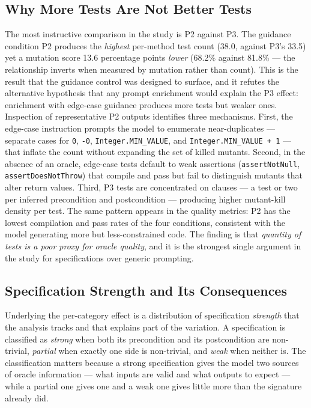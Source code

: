 \subsection{Why More Tests Are Not Better Tests}

The most instructive comparison in the study is P2 against P3. The guidance
condition P2 produces the \emph{highest} per-method test count (38.0, against
P3's 33.5) yet a mutation score 13.6 percentage points \emph{lower} (68.2\%
against 81.8\% --- the relationship inverts when measured by mutation rather
than count). This is the result that the guidance control was designed to
surface, and it refutes the alternative hypothesis that any prompt enrichment
would explain the P3 effect: enrichment with edge-case guidance produces more
tests but weaker ones. Inspection of representative P2 outputs identifies three
mechanisms. First, the edge-case instruction prompts the model to enumerate
near-duplicates --- separate cases for \texttt{0}, \texttt{-0},
\texttt{Integer.MIN\_VALUE}, and \texttt{Integer.MIN\_VALUE + 1} --- that
inflate the count without expanding the set of killed mutants. Second, in the
absence of an oracle, edge-case tests default to weak assertions
(\texttt{assertNotNull}, \texttt{assertDoesNotThrow}) that compile and pass but
fail to distinguish mutants that alter return values. Third, P3 tests are
concentrated on clauses --- a test or two per inferred precondition and
postcondition --- producing higher mutant-kill density per test. The same
pattern appears in the quality metrics: P2 has the lowest compilation and pass
rates of the four conditions, consistent with the model generating more but
less-constrained code. The finding is that \emph{quantity of tests is a poor
proxy for oracle quality}, and it is the strongest single argument in the study
for specifications over generic prompting.

\subsection{Specification Strength and Its Consequences}

Underlying the per-category effect is a distribution of specification
\emph{strength} that the analysis tracks and that explains part of the variation.
A specification is classified as \emph{strong} when both its precondition and its
postcondition are non-trivial, \emph{partial} when exactly one side is non-trivial,
and \emph{weak} when neither is. The classification matters because a strong
specification gives the model two sources of oracle information --- what inputs are
valid and what outputs to expect --- while a partial one gives one and a weak one
gives little more than the signature already did.

